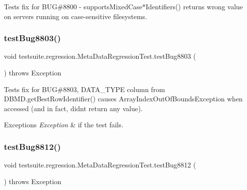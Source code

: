 Tests fix for B\+UG\#8800 -\/ supports\+Mixed\+Case$\ast$\+Identifiers() returns wrong value on servers running on case-\/sensitive filesystems. \mbox{\label{classtestsuite_1_1regression_1_1_meta_data_regression_test_a2f5b71ea6cea2579da1f5fd73cd93227}} 
\subsubsection{\texorpdfstring{test\+Bug8803()}{testBug8803()}}
{\footnotesize\ttfamily void testsuite.\+regression.\+Meta\+Data\+Regression\+Test.\+test\+Bug8803 (\begin{DoxyParamCaption}{ }\end{DoxyParamCaption}) throws Exception}

Tests fix for B\+UG\#8803, \textquotesingle{}D\+A\+T\+A\+\_\+\+T\+Y\+PE\textquotesingle{} column from D\+B\+M\+D.\+get\+Best\+Row\+Identifier() causes Array\+Index\+Out\+Of\+Bounds\+Exception when accessed (and in fact, didn\textquotesingle{}t return any value).


\begin{DoxyExceptions}{Exceptions}
{\em Exception} & if the test fails. \\
\hline
\end{DoxyExceptions}
\mbox{\label{classtestsuite_1_1regression_1_1_meta_data_regression_test_a2e1523fa5764c3a574ab345132d80ccb}} 
\subsubsection{\texorpdfstring{test\+Bug8812()}{testBug8812()}}
{\footnotesize\ttfamily void testsuite.\+regression.\+Meta\+Data\+Regression\+Test.\+test\+Bug8812 (\begin{DoxyParamCaption}{ }\end{DoxyParamCaption}) throws Exception}

